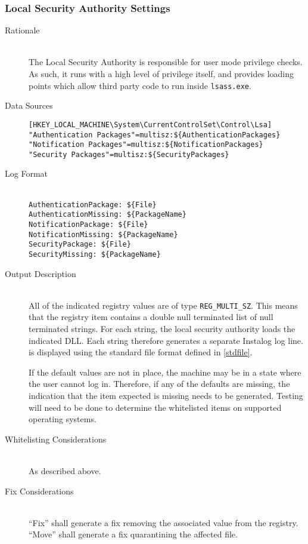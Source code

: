 \subsubsection{Local Security Authority Settings}
\begin{description}
\item[Rationale] \hfill \\
The Local Security Authority is responsible for user mode privilege checks. As
such, it runs with a high level of privilege itself, and provides loading points
which allow third party code to run inside \verb|lsass.exe|.
\item[Data Sources] \hfill
\vspace{-\baselineskip}
\begin{verbatim}
[HKEY_LOCAL_MACHINE\System\CurrentControlSet\Control\Lsa]
"Authentication Packages"=multisz:${AuthenticationPackages}
"Notification Packages"=multisz:${NotificationPackages}
"Security Packages"=multisz:${SecurityPackages}
\end{verbatim}
\item[Log Format] \hfill \\
\verb|AuthenticationPackage: ${File}| \\
\verb|AuthenticationMissing: ${PackageName}| \\
\verb|NotificationPackage: ${File}| \\
\verb|NotificationMissing: ${PackageName}| \\
\verb|SecurityPackage: ${File}| \\
\verb|SecurityMissing: ${PackageName}|
\item[Output Description] \hfill \\
All of the indicated registry values are of type \verb|REG_MULTI_SZ|. This
means that the registry item contains a double null terminated list of null
terminated strings. For each string, the local security authority loads the
indicated DLL. Each string therefore generates a separate Instalog log line.
 is displayed using the standard file format defined in \ref{stdfile}.

If the default values are not in place, the machine may be in a state where the
user cannot log in. Therefore, if any of the defaults are missing, the
indication that the item expected is missing needs to be generated. Testing will
need to be done to determine the whitelisted items on supported operating
systems.
\item[Whitelisting Considerations] \hfill \\
As described above.
\item[Fix Considerations] \hfill \\
``Fix'' shall generate a fix removing the associated value from the registry.
``Move'' shall generate a fix quarantining the affected file.
\end{description}

